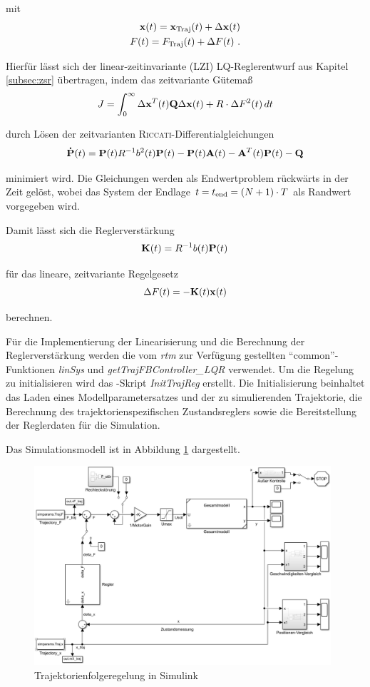 mit 
\begin{align*}
	\boldsymbol{\mathrm{x}}(t) = \boldsymbol{\mathrm{x}}_{\mathrm{Traj}}(t) + \Delta \boldsymbol{\mathrm{x}}(t) \\
	 F(t) = F_{\mathrm{Traj}}(t) + \Delta F(t) \ .
\end{align*}

Hierfür lässt sich der linear-zeitinvariante (LZI) LQ-Reglerentwurf aus Kapitel \ref{subsec:zsr} übertragen, indem das zeitvariante Gütemaß 
	\[
	J = \int_{0}^{\infty} \Delta \boldsymbol{\mathrm{x}}^T(t) {\boldsymbol{\mathrm{Q}}} \Delta \boldsymbol{\mathrm{x}}(t) + R \cdot \Delta F^2(t) \, dt
\]

durch Lösen der zeitvarianten \textsc{Riccati}-Differentialgleichungen
	\[
	{\boldsymbol{\mathrm{\dot{P}}}}(t) = {\boldsymbol{\mathrm{P}}}(t) R^{-1} b^2(t) {\boldsymbol{\mathrm{P}}}(t) - {\boldsymbol{\mathrm{P}}}(t) {\boldsymbol{\mathrm{A}}}(t) - {\boldsymbol{\mathrm{A}}}^T(t) {\boldsymbol{\mathrm{P}}}(t) - {\boldsymbol{\mathrm{Q}}}
\]

minimiert wird. Die Gleichungen werden als Endwertproblem rückwärts in der Zeit gelöst, wobei das System der Endlage $t=t_{\mathrm{end}} = (N+1) \cdot T$ als Randwert vorgegeben wird. 

Damit lässt sich die Reglerverstärkung 
	\[
	{\boldsymbol{\mathrm{K}}}(t) = R^{-1} b(t) {\boldsymbol{\mathrm{P}}}(t)
\]

für das lineare, zeitvariante Regelgesetz
	\[
	\Delta F(t) = -{\boldsymbol{\mathrm{K}}}(t) \boldsymbol{\mathrm{x}}(t)
\]

berechnen.

Für die Implementierung der Linearisierung und die Berechnung der Reglerverstärkung werden die vom \emph{rtm} zur Verfügung gestellten "`common"'-Funktionen \textit{linSys} und \textit{getTrajFBController\_LQR} verwendet. Um die Regelung zu initialisieren wird das \Matlab-Skript \textit{InitTrajReg} erstellt. Die Initialisierung beinhaltet das Laden eines Modellparametersatzes und der zu simulierenden Trajektorie, die Berechnung des trajektorienspezifischen Zustandsreglers sowie die Bereitstellung der Reglerdaten für die Simulation. 

Das Simulationsmodell ist in Abbildung \ref{fig:TFR_Simulink} dargestellt.

\begin{figure}[h]
	\centering
		\includegraphics[width=0.98\textwidth]{Bilder/Trajektorien/TFR_Simulink.PNG}
	\caption{Trajektorienfolgeregelung in Simulink}
	\label{fig:TFR_Simulink}
\end{figure}

